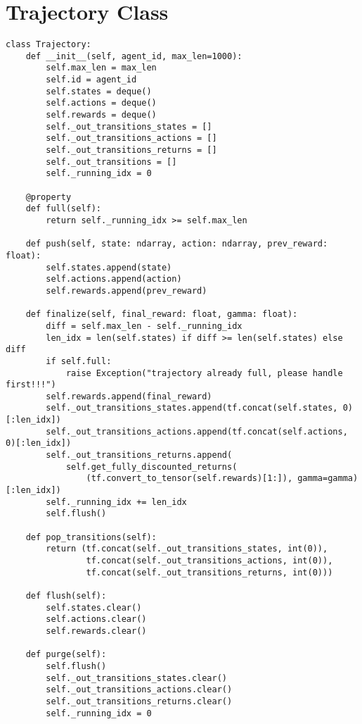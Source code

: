 \section{Trajectory Class}\label{appendix:code:trajectory}
\begin{lstlisting}[basicstyle=\footnotesize]
class Trajectory:
    def __init__(self, agent_id, max_len=1000):
        self.max_len = max_len
        self.id = agent_id
        self.states = deque()
        self.actions = deque()
        self.rewards = deque()
        self._out_transitions_states = []
        self._out_transitions_actions = []
        self._out_transitions_returns = []
        self._out_transitions = []
        self._running_idx = 0

    @property
    def full(self):
        return self._running_idx >= self.max_len

    def push(self, state: ndarray, action: ndarray, prev_reward: float): 
        self.states.append(state)
        self.actions.append(action)
        self.rewards.append(prev_reward)

    def finalize(self, final_reward: float, gamma: float):
        diff = self.max_len - self._running_idx
        len_idx = len(self.states) if diff >= len(self.states) else diff
        if self.full:
            raise Exception("trajectory already full, please handle first!!!")
        self.rewards.append(final_reward)
        self._out_transitions_states.append(tf.concat(self.states, 0)[:len_idx])
        self._out_transitions_actions.append(tf.concat(self.actions, 0)[:len_idx])
        self._out_transitions_returns.append(
            self.get_fully_discounted_returns(
                (tf.convert_to_tensor(self.rewards)[1:]), gamma=gamma)[:len_idx])
        self._running_idx += len_idx
        self.flush()

    def pop_transitions(self):
        return (tf.concat(self._out_transitions_states, int(0)),
                tf.concat(self._out_transitions_actions, int(0)),
                tf.concat(self._out_transitions_returns, int(0)))

    def flush(self): 
        self.states.clear()
        self.actions.clear()
        self.rewards.clear()

    def purge(self):
        self.flush()
        self._out_transitions_states.clear()
        self._out_transitions_actions.clear()
        self._out_transitions_returns.clear()
        self._running_idx = 0
\end{lstlisting}
